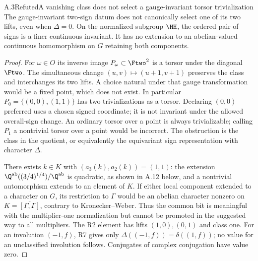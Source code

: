 \begin{statement}{A.3}{Refuted}{A vanishing class does not select a gauge-invariant torsor trivialization}
The gauge-invariant two-sign datum does not canonically select one
of its two lifts, even when $\Delta=0$. On the normalized subgroup
$\HH$, the ordered pair of signs is a finer continuous invariant.
It has no extension to an abelian-valued continuous homomorphism on
$G$ retaining both components.
\end{statement}
\begin{proof}
For $\omega\in O$ its inverse image
$P_\omega\subset\Ftwo^2$ is a torsor under the diagonal $\Ftwo$.
The simultaneous change $(u,v)\mapsto(u+1,v+1)$ preserves the
class and interchanges its two lifts. A choice natural under that
gauge transformation would be a fixed point, which does not exist.
In particular $P_0=\{(0,0),(1,1)\}$ has two trivializations as a
torsor. Declaring $(0,0)$ preferred uses a chosen signed coordinate;
it is not invariant under the allowed overall-sign change.
An ordinary torsor over a point is always trivializable; calling
$P_1$ a nontrivial torsor over a point would be incorrect. The
obstruction is the class in the quotient, or equivalently the
equivariant sign representation with character $\Delta$.

There exists $k\in K$ with $(a_3(k),a_2(k))=(1,1)$: the extension
$\Q^{\rm ab}((3/4)^{1/4})/\Q^{\rm ab}$ is quadratic, as shown in
A.12 below, and a nontrivial automorphism extends to an element of
$K$. If either local component extended to a character on $G$, its
restriction to $\Gamma$ would be an abelian character nonzero on
$K=\overline{[\Gamma,\Gamma]}$, contrary to Kronecker--Weber.
Thus the common bit is meaningful with the multiplier-one
normalization but cannot be promoted in the suggested way to all
multipliers. The R2 element has lifts $(1,0),(0,1)$ and class one.
For an involution $(-1,f)$, R7 gives only
$\Delta((-1,f))=\delta((1,f))$; no value for an unclassified
involution follows. Conjugates of complex conjugation have value
zero.
\end{proof}

